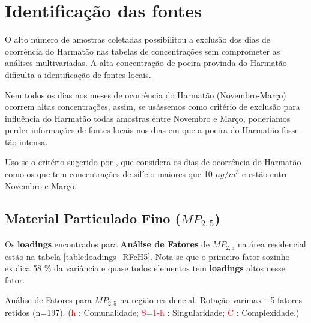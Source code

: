 \section{Identificação das fontes}

O alto número de amostras coletadas possibilitou a exclusão dos dias de 
ocorrência do Harmatão nas tabelas de concentrações sem comprometer as análises
multivariadas. A alta concentração de poeira provinda do Harmatão dificulta a 
identificação de fontes locais.

Nem todos os dias nos meses de ocorrência do Harmatão (Novembro-Março) 
ocorrem altas concentrações, assim, se usássemos como critério de exclusão para 
influência do Harmatão todas amostras entre Novembro e Março, poderíamos
perder informações de fontes locais nos dias em que a poeira do Harmatão fosse
tão intensa. 

Uso-se o critério sugerido por \cite{aboh2009}, que considera os dias de 
ocorrência do Harmatão como os que tem concentrações de silício maiores que 
10 $\mu g/m^3$ e estão entre Novembro e Março.


\subsection{Material Particulado Fino ($MP_{2,5}$)}

Os \textbf{loadings} encontrados para \textbf{Análise de Fatores} de $MP_{2,5}$
na área residencial estão na tabela \ref{table:loadings_RFcH5}. 
Nota-se que o primeiro fator sozinho explica 58 \% da variância e quase todos 
elementos tem \textbf{loadings} altos nesse fator. 

\begin{table}[H]
  
  \caption{Análise de Fatores para $MP_{2,5}$ na região residencial.
           Rotação varimax - 5 fatores retidos (n=197).
           (\textcolor{red}{h} : Comunalidade; 
           \textcolor{red}{S=1-h} : Singularidade; 
           \textcolor{red}{C} : Complexidade.)
           \label{table:loadings_RFcH5}}
\end{table}

